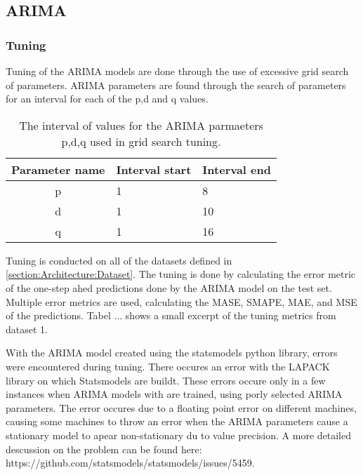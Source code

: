 \subsection{ARIMA}
\label{section:Restuls:ARIMA}


\subsubsection{Tuning}
\label{section:Results:ARIMA:Tuning}
Tuning of the ARIMA models are done through the use of excessive grid search of parameters.
ARIMA parameters are found through the search of parameters for an interval for each of the p,d and q values.

\begin{table}[h]
  \centering
  \caption{The interval of values for the ARIMA parmaeters p,d,q used in grid search tuning.}
  \label{table:results:arima:tuning_parameter_interval}
  \begin{tabular}{|c|l|l|}\hline
    Parameter name & Interval start     & Interval end   \\ \hline
    p   & 1         & 8                 \\ \hline
    d   & 1         & 10                \\ \hline
    q   & 1         & 16                \\ \hline
  \end{tabular}
\end{table}

Tuning is conducted on all of the datasets defined in \cref{section:Architecture:Dataset}.
The tuning is done by calculating the error metric of the one-step ahed predictions done by the ARIMA model on the test set.
Multiple error metrics are used, calculating the MASE, SMAPE, MAE, and MSE of the predictions.
Tabel ... shows a small excerpt of the tuning metrics from dataset 1.


With the ARIMA model created using the statsmodels python library, errors were encountered during tuning.
There occures an error with the LAPACK library on which Statsmodels are buildt.
These errors occure only in a few instances when ARIMA models with are trained, using porly selected ARIMA parameters.
The error occures due to a floating point error on different machines, causing some machines to throw an error when the ARIMA parameters cause a stationary model to apear non-stationary du to value precision.
A more detailed descussion on the problem can be found here: https://github.com/statsmodels/statsmodels/issues/5459.

